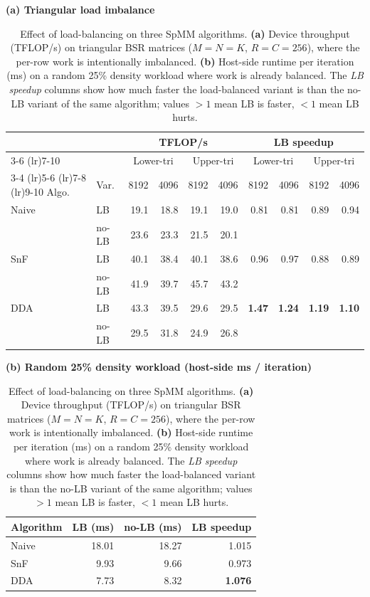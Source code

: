 \begin{table}[t]
\centering
\caption{Effect of load-balancing on three SpMM algorithms.
\textbf{(a)} Device throughput (TFLOP/s) on triangular BSR matrices
($M{=}N{=}K$, $R{=}C{=}256$), where the per-row work is intentionally
imbalanced. \textbf{(b)} Host-side runtime per iteration (ms) on a random
25\% density workload where work is already balanced. The \emph{LB speedup}
columns show how much faster the load-balanced variant is than the
no-LB variant of the same algorithm; values $>1$ mean LB is faster,
$<1$ mean LB hurts.}
\label{tab:load_imbalance}
\small

\textbf{(a) Triangular load imbalance} \\[2pt]
\begin{tabular}{l@{\,\,}l rrrr rrrr}
\toprule
 & & \multicolumn{4}{c}{TFLOP/s} & \multicolumn{4}{c}{LB speedup} \\
\cmidrule(lr){3-6} \cmidrule(lr){7-10}
 & & \multicolumn{2}{c}{Lower-tri} & \multicolumn{2}{c}{Upper-tri} & \multicolumn{2}{c}{Lower-tri} & \multicolumn{2}{c}{Upper-tri} \\
\cmidrule(lr){3-4} \cmidrule(lr){5-6} \cmidrule(lr){7-8} \cmidrule(lr){9-10}
Algo. & Var. & 8192 & 4096 & 8192 & 4096 & 8192 & 4096 & 8192 & 4096 \\
\midrule
Naive & LB    & 19.1 & 18.8 & 19.1 & 19.0 & 0.81 & 0.81 & 0.89 & 0.94 \\
      & no-LB & 23.6 & 23.3 & 21.5 & 20.1 &      &      &      &      \\
\addlinespace[2pt]
SnF   & LB    & 40.1 & 38.4 & 40.1 & 38.6 & 0.96 & 0.97 & 0.88 & 0.89 \\
      & no-LB & 41.9 & 39.7 & 45.7 & 43.2 &      &      &      &      \\
\addlinespace[2pt]
DDA   & LB    & 43.3 & 39.5 & 29.6 & 29.5 & \textbf{1.47} & \textbf{1.24} & \textbf{1.19} & \textbf{1.10} \\
      & no-LB & 29.5 & 31.8 & 24.9 & 26.8 &      &      &      &      \\
\bottomrule
\end{tabular}

\vspace{8pt}

\textbf{(b) Random 25\% density workload (host-side ms / iteration)} \\[2pt]
\begin{tabular}{l rrr}
\toprule
Algorithm & LB (ms) & no-LB (ms) & LB speedup \\
\midrule
Naive & 18.01 & 18.27 & 1.015 \\
SnF   &  9.93 &  9.66 & 0.973 \\
DDA   &  7.73 &  8.32 & \textbf{1.076} \\
\bottomrule
\end{tabular}
\end{table}
